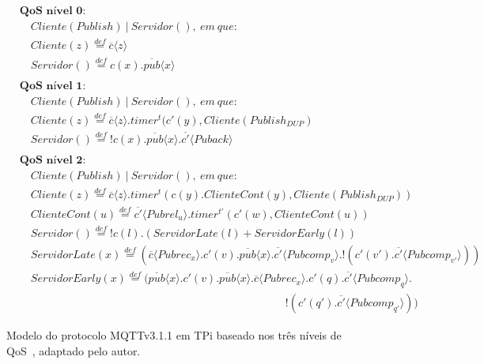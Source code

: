 \begin{figure}[ht]
	\centering
\begin{align}
&\textbf{QoS~nível~0:} \nonumber \\
&\quad Cliente(Publish)~|~Servidor(),~em~ que: \nonumber \\
&\quad Cliente(z) \stackrel{def}{=} \overline{c}\langle z \rangle \nonumber \\
&\quad Servidor() \stackrel{def}{=} c(x).\overline{pub}\langle x \rangle \label{eq:qos0} \\
& \nonumber \\
&\textbf{QoS~nível~1:} \nonumber \\
&\quad Cliente(Publish)~|~Servidor(),~em~ que: \nonumber \\
&\quad Cliente(z) \stackrel{def}{=} \overline{c}\langle z \rangle.timer^{t}(c'(y),Cliente(Publish_{DUP}) \nonumber \\
&\quad Servidor() \stackrel{def}{=} !c(x).\overline{pub}\langle x \rangle . \overline{c'} \langle Puback \rangle \\
& \nonumber \\
&\textbf{QoS~nível~2:} \nonumber \\
&\quad Cliente(Publish)~|~Servidor(),~em~ que: \nonumber \\
&\quad Cliente(z) \stackrel{def}{=} \overline{c}\langle z \rangle.timer^{t}(c(y).ClienteCont(y), Cliente(Publish_{DUP})) \nonumber \\
&\quad ClienteCont(u) \stackrel{def}{=} \overline{c'}\langle Pubrel_{u} \rangle . timer^{t'} (c'(w), ClienteCont(u)) \nonumber \\
&\quad Servidor() \stackrel{def}{=} !c(l).(ServidorLate(l) + ServidorEarly(l)) \nonumber \\
&\quad ServidorLate(x) \stackrel{def}{=} (\overline{c}\langle Pubrec_{x} \rangle.c'(v).\overline{pub}\langle x \rangle.\overline{c'}\langle Pubcomp_{v} \rangle.!(c'(v').\overline{c'}\langle Pubcomp_{v'} \rangle)) \nonumber \\
&\quad ServidorEarly(x) \stackrel{def}{=} (\overline{pub}\langle x \rangle.c'(v).\overline{pub}\langle x \rangle.\overline{c}\langle Pubrec_{x} \rangle.c'(q).\overline{c'}\langle Pubcomp_{q} \rangle. \nonumber \\
&\quad \quad \quad \quad \quad \quad \quad \quad \quad \quad \quad \quad \quad \quad \quad \quad \quad \quad \quad \quad \quad \quad \quad \quad  !(c'(q').\overline{c'}\langle Pubcomp_{q'} \rangle))
\end{align}
	\caption{Modelo do protocolo MQTTv3.1.1 em TPi baseado nos três níveis de QoS~\cite{aziz2016formal}, adaptado pelo autor.
		\label{fig:mqtt_model}}
\end{figure}
\FloatBarrier

